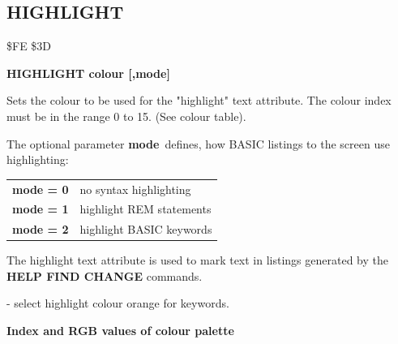
\newpage
\subsection{HIGHLIGHT}
\begin{description}[leftmargin=2cm,style=nextline]
\item [Token:] \$FE \$3D
\item [Format:] {\bf HIGHLIGHT colour [,mode]}
\item [Usage:] Sets the colour
               to be used for the "highlight" text attribute.
               The colour index must be in the
               range 0 to 15. (See colour table).

               The optional parameter {\bf mode} defines, how
               BASIC listings to the screen use highlighting:

{\ttfamily
\begin{tabular}{|l|l|}
\hline
   {\bf mode = 0}    &  no syntax highlighting \\
   {\bf mode = 1}    &  highlight REM statements \\
   {\bf mode = 2}    &  highlight BASIC keywords \\
\hline
\end{tabular}
}

\item [Remarks:] The highlight text attribute is used to mark text
               in listings generated by the {\bf HELP FIND CHANGE}
               commands.
\item [Example:]  - select highlight colour orange
                 for keywords.
\item [Colours:] {\bf Index and RGB values of colour palette}


\end{description}
